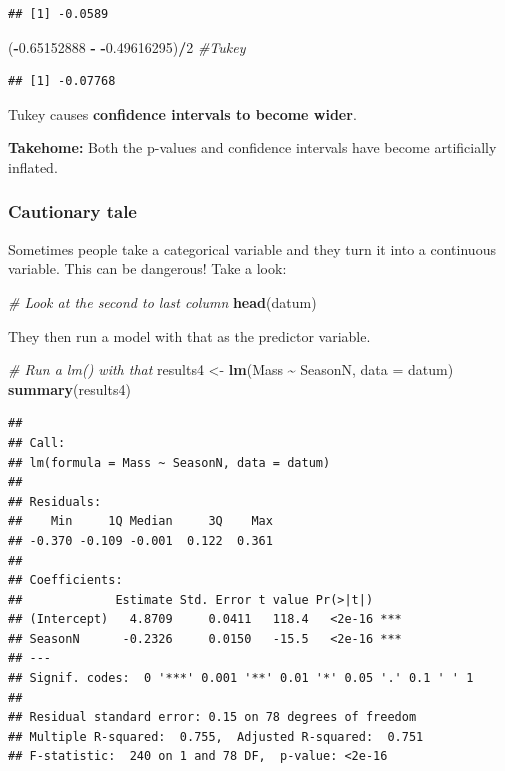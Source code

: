 \documentclass[
]{article}
\newenvironment{Shaded}{\begin{snugshade}}{\end{snugshade}}
\newcommand{\AttributeTok}[1]{\textcolor[rgb]{0.13,0.29,0.53}{#1}}
\newcommand{\CommentTok}[1]{\textcolor[rgb]{0.56,0.35,0.01}{\textit{#1}}}
\newcommand{\DecValTok}[1]{\textcolor[rgb]{0.00,0.00,0.81}{#1}}
\newcommand{\FloatTok}[1]{\textcolor[rgb]{0.00,0.00,0.81}{#1}}
\newcommand{\FunctionTok}[1]{\textcolor[rgb]{0.13,0.29,0.53}{\textbf{#1}}}
\newcommand{\NormalTok}[1]{#1}
\newcommand{\OtherTok}[1]{\textcolor[rgb]{0.56,0.35,0.01}{#1}}
\newcommand{\SpecialCharTok}[1]{\textcolor[rgb]{0.81,0.36,0.00}{\textbf{#1}}}
\begin{document}
\begin{verbatim}
## [1] -0.0589
\end{verbatim}

\begin{Shaded}
\begin{Highlighting}[]
\NormalTok{(}\SpecialCharTok{{-}}\FloatTok{0.65152888} \SpecialCharTok{{-}} \SpecialCharTok{{-}}\FloatTok{0.49616295}\NormalTok{)}\SpecialCharTok{/}\DecValTok{2} \CommentTok{\#Tukey}
\end{Highlighting}
\end{Shaded}

\begin{verbatim}
## [1] -0.07768
\end{verbatim}

Tukey causes \textbf{confidence intervals to become wider}.

\textbf{Takehome:} Both the p-values and confidence intervals have
become artificially inflated.

\subsubsection{Cautionary tale}\label{cautionary-tale}

Sometimes people take a categorical variable and they turn it into a
continuous variable. This can be dangerous! Take a look:

\begin{Shaded}
\begin{Highlighting}[]
\CommentTok{\# Look at the second to last column}
\FunctionTok{head}\NormalTok{(datum)}
\end{Highlighting}
\end{Shaded}

They then run a model with that as the predictor variable.

\begin{Shaded}
\begin{Highlighting}[]
\CommentTok{\# Run a \textquotesingle{}lm()\textquotesingle{} with that}
\NormalTok{results4 }\OtherTok{\textless{}{-}} \FunctionTok{lm}\NormalTok{(Mass }\SpecialCharTok{\textasciitilde{}}\NormalTok{ SeasonN, }\AttributeTok{data =}\NormalTok{ datum)}
\FunctionTok{summary}\NormalTok{(results4)}
\end{Highlighting}
\end{Shaded}

\begin{verbatim}
## 
## Call:
## lm(formula = Mass ~ SeasonN, data = datum)
## 
## Residuals:
##    Min     1Q Median     3Q    Max 
## -0.370 -0.109 -0.001  0.122  0.361 
## 
## Coefficients:
##             Estimate Std. Error t value Pr(>|t|)    
## (Intercept)   4.8709     0.0411   118.4   <2e-16 ***
## SeasonN      -0.2326     0.0150   -15.5   <2e-16 ***
## ---
## Signif. codes:  0 '***' 0.001 '**' 0.01 '*' 0.05 '.' 0.1 ' ' 1
## 
## Residual standard error: 0.15 on 78 degrees of freedom
## Multiple R-squared:  0.755,  Adjusted R-squared:  0.751 
## F-statistic:  240 on 1 and 78 DF,  p-value: <2e-16
\end{verbatim}
\end{document}
